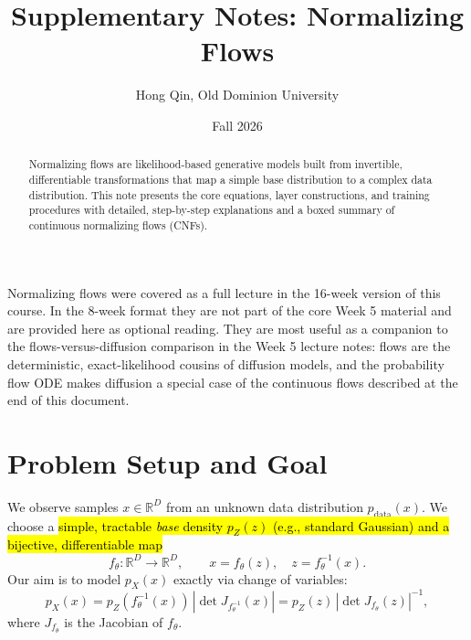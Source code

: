 \documentclass[11pt]{article}
\title{Supplementary Notes: Normalizing Flows}
\author{Hong Qin, Old Dominion University}
\date{Fall 2026}
\newcommand{\R}{\mathbb{R}}
\theoremstyle{remark}
\begin{document}
\maketitle

\begin{center}
\begin{tcolorbox}[width=0.95\textwidth, title=\textbf{About these supplementary notes}]
Normalizing flows were covered as a full lecture in the 16-week version of this course. In the 8-week format they are not part of the core Week 5 material and are provided here as optional reading. They are most useful as a companion to the flows-versus-diffusion comparison in the Week 5 lecture notes: flows are the deterministic, exact-likelihood cousins of diffusion models, and the probability flow ODE makes diffusion a special case of the continuous flows described at the end of this document.
\end{tcolorbox}
\end{center}

\begin{abstract}
Normalizing flows are likelihood-based generative models built from invertible, differentiable transformations that map a simple base distribution to a complex data distribution. This note presents the core equations, layer constructions, and training procedures with detailed, step-by-step explanations and a boxed summary of continuous normalizing flows (CNFs).
\end{abstract}

\tableofcontents
\bigskip

\section{Problem Setup and Goal}
We observe samples $x \in \R^D$ from an unknown data distribution $p_{\text{data}}(x)$. We choose a \hl{simple, tractable \emph{base} density $p_Z(z)$ (e.g., standard Gaussian) and a bijective, differentiable map}
\begin{equation}
f_\theta: \R^D \to \R^D, \qquad x = f_\theta(z), \quad z = f_\theta^{-1}(x).
\label{eq:flow-map}
\end{equation}
Our aim is to model $p_X(x)$ exactly via change of variables:
\begin{equation}
p_X(x) = p_Z\!\left(f_\theta^{-1}(x)\right)\, \left|\det J_{f_\theta^{-1}}(x)\right|
= p_Z(z)\, \left|\det J_{f_\theta}(z)\right|^{-1},
\label{eq:change-of-variables}
\end{equation}
where $J_{f_\theta}$ is the Jacobian of $f_\theta$.
\end{document}
